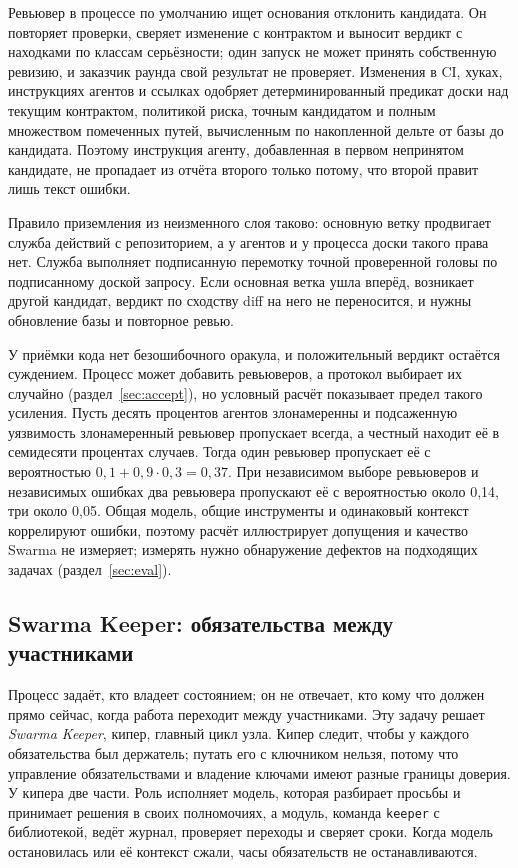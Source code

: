 \documentclass[10pt,a4paper]{article}
\begin{document}
Ревьювер в процессе по умолчанию ищет основания отклонить кандидата. Он повторяет проверки, сверяет изменение с контрактом и выносит вердикт с находками по классам серьёзности; один запуск не может принять собственную ревизию, и заказчик раунда свой результат не проверяет. Изменения в CI, хуках, инструкциях агентов и ссылках одобряет детерминированный предикат доски над текущим контрактом, политикой риска, точным кандидатом и полным множеством помеченных путей, вычисленным по накопленной дельте от базы до кандидата. Поэтому инструкция агенту, добавленная в первом непринятом кандидате, не пропадает из отчёта второго только потому, что второй правит лишь текст ошибки.

\label{sec:landing}Правило приземления из неизменного слоя таково: основную ветку продвигает служба действий с репозиторием, а у агентов и у процесса доски такого права нет. Служба выполняет подписанную перемотку точной проверенной головы по подписанному доской запросу. Если основная ветка ушла вперёд, возникает другой кандидат, вердикт по сходству diff на него не переносится, и нужны обновление базы и повторное ревью.

У приёмки кода нет безошибочного оракула, и положительный вердикт остаётся суждением. Процесс может добавить ревьюверов, а протокол выбирает их случайно (раздел~\ref{sec:accept}), но условный расчёт показывает предел такого усиления. Пусть десять процентов агентов злонамеренны и подсаженную уязвимость злонамеренный ревьювер пропускает всегда, а честный находит её в семидесяти процентах случаев. Тогда один ревьювер пропускает её с вероятностью $0{,}1+0{,}9\cdot0{,}3=0{,}37$. При независимом выборе ревьюверов и независимых ошибках два ревьювера пропускают её с вероятностью около 0,14, три около 0,05. Общая модель, общие инструменты и одинаковый контекст коррелируют ошибки, поэтому расчёт иллюстрирует допущения и качество Swarma не измеряет; измерять нужно обнаружение дефектов на подходящих задачах (раздел~\ref{sec:eval}).

\subsection{Swarma Keeper: обязательства между участниками}
\label{sec:keeper}

Процесс задаёт, кто владеет состоянием; он не отвечает, кто кому что должен прямо сейчас, когда работа переходит между участниками. Эту задачу решает \emph{Swarma Keeper}, кипер, главный цикл узла. Кипер следит, чтобы у каждого обязательства был держатель; путать его с ключником нельзя, потому что управление обязательствами и владение ключами имеют разные границы доверия. У кипера две части. Роль исполняет модель, которая разбирает просьбы и принимает решения в своих полномочиях, а модуль, команда \texttt{keeper} с библиотекой, ведёт журнал, проверяет переходы и сверяет сроки. Когда модель остановилась или её контекст сжали, часы обязательств не останавливаются.
\end{document}
